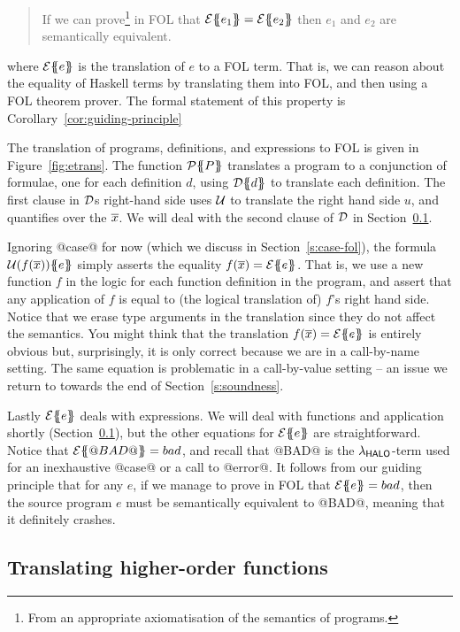 \begin{quote}
If we can prove\footnote{From an appropriate axiomatisation of the semantics of 
programs.} in FOL that $\etrans{}{}{e_1} = \etrans{}{}{e_2}$ then
$e_1$ and $e_2$ are semantically equivalent.
\end{quote}

where $\etrans{}{}{e}$ is the translation of $e$ to a FOL term. That is, we can
reason about the equality of Haskell terms by translating them into FOL, and then using
a FOL theorem prover. The formal statement of this property is Corollary~\ref{cor:guiding-principle}

The translation of programs, definitions, and expressions to FOL
is given in Figure~\ref{fig:etrans}.
The function $\ptrans{}{P}$ translates a program to a conjunction of formulae,
one for each definition $d$, using $\dtrans{}{d}$ to translate
each definition.
The first clause in $\cal D$s right-hand side uses $\cal U$ to 
translate the right hand side $u$, and quantifies over the $\ol{x}$.  
We will deal with the second clause of $\cal D$
in Section~\ref{s:hof}.

Ignoring @case@ for now (which we discuss in Section~\ref{s:case-fol}),
the formula $\utrans{}{e}{f(\ol{x})}$
simply asserts the equality $f(\ol{x}) = \etrans{}{}{e}$.
That is, we use a new function $f$ in the logic for each function definition in the
program, and assert that any application of $f$ is equal to (the logical translation of)
$f$'s right hand side. Notice that we erase type arguments in the translation
since they do not affect the semantics. You might think that the translation 
$f(\ol{x}) = \etrans{}{}{e}$ is entirely obvious but, surprisingly, it is only correct 
because we are in a call-by-name setting. The same equation is problematic in a 
call-by-value setting -- an issue 
we return to towards the end of Section~\ref{s:soundness}.

Lastly $\etrans{}{}{e}$ deals with expressions.  We will deal with
functions and application shortly
(Section~\ref{s:hof}), but the other equations for $\etrans{}{}{e}$
are straightforward.  Notice that $\etrans{}{}{@BAD@} = bad$, and recall
that @BAD@ is the $\theLang$-term used for an inexhaustive @case@ or a call
to @error@.  It follows from our guiding principle
that for any $e$, if we manage to prove in FOL that $ \etrans{}{}{e} = bad $, 
then the source program $e$
must be semantically equivalent to @BAD@, meaning that it definitely
crashes.

\subsection{Translating higher-order functions} \label{s:hof}

